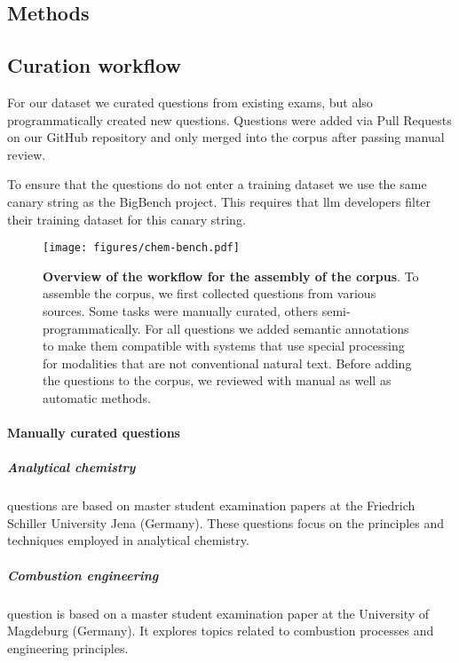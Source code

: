\documentclass[11pt, oneside]{article}
\begin{document}
\begin{refsection}
\clearpage

\section{Methods}

\subsection{Curation workflow}\label{sec:curation}
For our dataset we curated questions from existing exams, but also programmatically created new questions.
Questions were added via Pull Requests on our GitHub repository and only merged into the corpus after passing manual review.

To ensure that the questions do not enter a training dataset we use the same canary string as the BigBench project.
This requires that \Gls{llm} developers filter their training dataset for this canary string.\autocite{openai2024gpt4, srivastava2022beyond}

\begin{figure}[!h]
    \texttt{[image: figures/chem-bench.pdf]}
    \caption{\textbf{Overview of the workflow for the assembly of the \chembench corpus}. To assemble the \chembench corpus, we first collected questions from various sources. Some tasks were manually curated, others semi-programmatically. For all questions we added semantic annotations to make them compatible with systems that use special processing for modalities that are not conventional natural text. Before adding the questions to the corpus, we reviewed with manual as well as automatic methods.}
    \label{fig:curation_workflow}
\end{figure}

\paragraph{Manually curated questions}

\subparagraph{Analytical chemistry}
 questions are based on master student examination papers at the Friedrich Schiller University Jena (Germany). 
These questions focus on the principles and techniques employed in analytical chemistry.

\subparagraph{Combustion engineering}
 question is based on a master student examination paper at the University of Magdeburg (Germany). 
It explores topics related to combustion processes and engineering principles.


\end{refsection}
\end{document}
